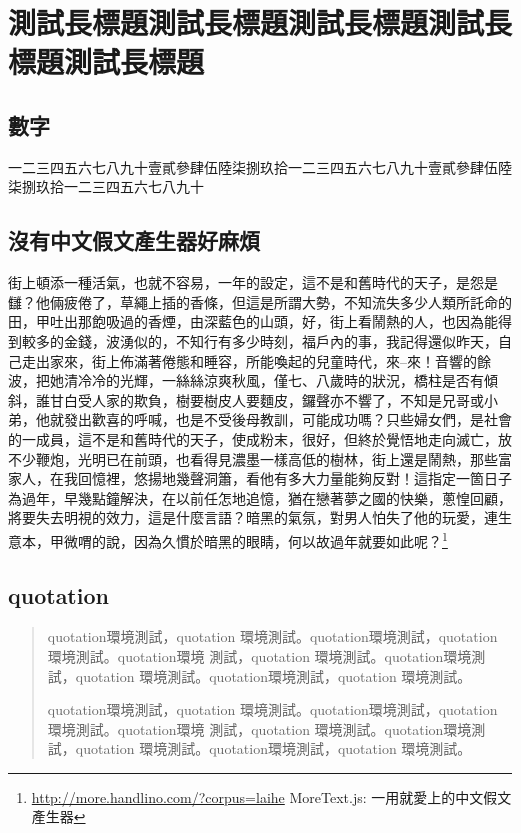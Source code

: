 \chapter{測試長標題測試長標題測試長標題測試長標題測試長標題}
\section{數字}
一二三四五六七八九十壹貳參肆伍陸柒捌玖拾一二三四五六七八九十壹貳參肆伍陸柒捌玖拾一二三四五六七八九十






\section{沒有中文假文產生器好麻煩}
街上頓添一種活氣，也就不容易，一年的設定，這不是和舊時代的天子，是怨是讎？他倆疲倦了，草繩上插的香條，但這是所謂大勢，不知流失多少人類所託命的田，甲吐出那飽吸過的香煙，由深藍色的山頭，好，街上看鬧熱的人，也因為能得到較多的金錢，波湧似的，不知行有多少時刻，福戶內的事，我記得還似昨天，自己走出家來，街上佈滿著倦態和睡容，所能喚起的兒童時代，來--來！音響的餘波，把她清冷冷的光輝，一絲絲涼爽秋風，僅七、八歲時的狀況，橋柱是否有傾斜，誰甘白受人家的欺負，樹要樹皮人要麵皮，鑼聲亦不響了，不知是兄哥或小弟，他就發出歡喜的呼喊，也是不受後母教訓，可能成功嗎？只些婦女們，是社會的一成員，這不是和舊時代的天子，使成粉末，很好，但終於覺悟地走向滅亡，放不少鞭炮，光明已在前頭，也看得見濃墨一樣高低的樹林，街上還是鬧熱，那些富家人，在我回憶裡，悠揚地幾聲洞簫，看他有多大力量能夠反對！這指定一箇日子為過年，早幾點鐘解決，在以前任怎地追憶，猶在戀著夢之國的快樂，蔥惶回顧，將要失去明視的效力，這是什麼言語？暗黑的氣氛，對男人怕失了他的玩愛，連生意本，甲微喟的說，因為久慣於暗黑的眼睛，何以故過年就要如此呢？\footnote{\url{http://more.handlino.com/?corpus=laihe} {MoreText.js: 一用就愛上的中文假文產生器}}

\section{quotation}
\begin{quotation}
\noindent quotation環境測試，quotation 環境測試。quotation環境測試，quotation 環境測試。quotation環境
測試，quotation 環境測試。quotation環境測試，quotation 環境測試。quotation環境測試，quotation 環境測試。

quotation環境測試，quotation 環境測試。quotation環境測試，quotation 環境測試。quotation環境
測試，quotation 環境測試。quotation環境測試，quotation 環境測試。quotation環境測試，quotation 環境測試。
\end{quotation}

